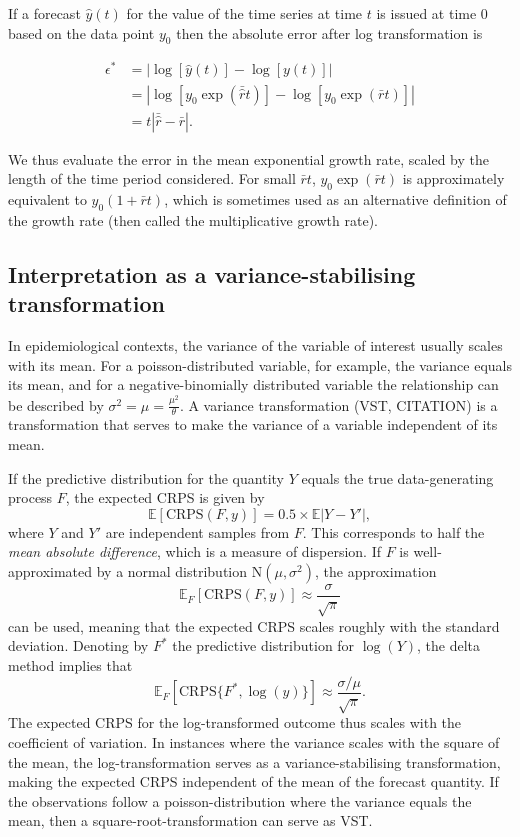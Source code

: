 \documentclass{article}
\begin{document}
If a forecast $\hat{y}(t)$ for the value of the time series at time $t$ is issued at time 0 based on the data point $y_0$ then the absolute error after log transformation is
%
\begin{linenomath*}
\begin{align*}
\epsilon^* &= \left| \log \left[ \hat{y}( t ) \right] - \log \left[ y ( t ) \right] \right|\\
           &= \left| \log \left[ y_0 \exp (\bar{\hat{r}} t ) \right] - \log \left[ y_0 \exp (\bar{r}t) \right] \right|\\
           &= t \left| \bar{\hat{r}} - \bar{r} \right|.
\end{align*}
\end{linenomath*}
%
We thus evaluate the error in the mean exponential growth rate, scaled by the length of the time period considered. For small $\bar{r}t$, $ y_0 \exp (\bar{r}t)$ is approximately equivalent to $ y_0 (1 + \bar{r}t)$, which is sometimes used as an alternative definition of the growth rate (then called the multiplicative growth rate). 

\subsection{Interpretation as a variance-stabilising transformation}

In epidemiological contexts, the variance of the variable of interest usually scales with its mean. For a poisson-distributed variable, for example, the variance equals its mean, and for a negative-binomially distributed variable the relationship can be described by $\sigma^2 = \mu = \frac{\mu^2}{\theta}$. A variance transformation (VST, CITATION) is a transformation that serves to make the variance of a variable independent of its mean. 

If the predictive distribution for the quantity $Y$ equals the true data-generating process $F$, the expected CRPS is given by \citep{gneitingStrictlyProperScoring2007}
$$
\mathbb{E}[\text{CRPS}(F, y)] = 0.5\times\mathbb{E}|Y - Y'|,
$$
where $Y$ and $Y'$ are independent samples from $F$. This corresponds to half the \textit{mean absolute difference}, which is a measure of dispersion. If $F$ is well-approximated by a normal distribution $\text{N}(\mu, \sigma^2)$, the approximation
$$
\mathbb{E}_F[\text{CRPS}(F, y)] \approx \frac{\sigma}{\sqrt{\pi}}
$$
can be used, meaning that the expected CRPS scales roughly with the standard deviation. Denoting by $F^*$ the predictive distribution for $\log(Y)$, the delta method implies that
$$
\mathbb{E}_F[\text{CRPS}\{F^*, \log(y)\}] \approx \frac{\sigma/\mu}{\sqrt{\pi}}.
$$
The expected CRPS for the log-transformed outcome thus scales with the coefficient of variation. In instances where the variance scales with the square of the mean, the log-transformation serves as a variance-stabilising transformation, making the expected CRPS independent of the mean of the forecast quantity. If the observations follow a poisson-distribution where the variance equals the mean, then a square-root-transformation can serve as VST. 
\end{document}
